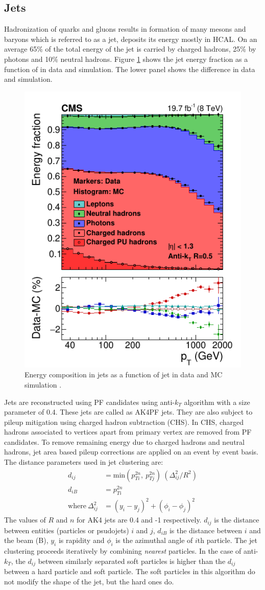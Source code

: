 \subsection{Jets}
Hadronization of quarks and gluons results in formation of many mesons and baryons which is referred to as a jet, deposits its energy 
mostly in HCAL. On an average 65\% of the total energy of the jet is carried by charged hadrons, 25\% by photons and 10\% neutral hadrons. 
Figure \ref{fig:JetEfrac} shows the jet energy fraction as a function of \pt in data and simulation. The lower panel shows the difference 
in data and simulation.
\begin{figure}[h!]
\centering
\includegraphics[width=0.5\linewidth]{../Figures/Chap2/JetEfrac}
\caption[Energy energy composition]{Energy composition in jets as a function of jet \pt in data and MC simulation \cite{CMS-PRF-14-001}.}
\label{fig:JetEfrac}
\end{figure}

Jets are reconstructed using PF candidates using anti-$k_T$ algorithm \cite{Cacciari:2008gp,Cacciari:2011ma} with a size parameter of 0.4. 
These jets are called as AK4PF jets. They are also subject to pileup mitigation using charged hadron subtraction (CHS). In CHS, charged 
hadrons associated to vertices apart from primary vertex are removed from PF candidates. To remove remaining energy due to charged hadrons 
and neutral hadrons, jet area based pileup corrections are applied on an event by event basis. The distance parameters used in jet 
clustering are:
\begin{align}
d_{ij} &= \mathrm{min}(p_{Ti}^{2n},\  p_{Tj}^{2n})\ (\Delta_{ij}^2/R^2)\\
d_{iB} &= p_{Ti}^{2n}\ \\ 
\mathrm{where\ } \Delta_{ij}^2 &= (y_i-y_j)^2 + (\phi_i - \phi_j)^2
\end{align}
The values of $R$ and $n$ for AK4 jets are 0.4 and -1 respectively. $d_{ij}$ is the distance between entities (particles or psudojets) $i$ 
and $j$, $d_{iB}$ is the distance between $i$ and the beam (B), $y_i$ is rapidity and $\phi_i$ is the azimuthal angle of $i$th particle. 
The jet clustering proceeds iteratively by combining \textit{nearest} particles. In the case of anti-$k_T$, the $d_{ij}$ between similarly 
separated soft particles is higher than the $d_{ij}$ between a hard particle and soft particle. The soft particles in this algorithm do 
not modify the shape of the jet, but the hard ones do.

